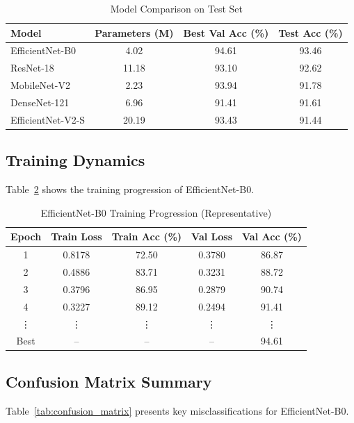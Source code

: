 \documentclass[conference]{IEEEtran}
\begin{document}
\begin{table}[h]
\centering
\caption{Model Comparison on Test Set}
\label{tab:model_comparison}
\begin{tabular}{lccc}
\toprule
\textbf{Model} & \textbf{Parameters (M)} & \textbf{Best Val Acc (\%)} & \textbf{Test Acc (\%)} \\
\midrule
EfficientNet-B0 & 4.02  & 94.61 & 93.46 \\
ResNet-18       & 11.18 & 93.10 & 92.62 \\
MobileNet-V2    & 2.23  & 93.94 & 91.78 \\
DenseNet-121    & 6.96  & 91.41 & 91.61 \\
EfficientNet-V2-S & 20.19 & 93.43 & 91.44 \\
\bottomrule
\end{tabular}
\end{table}



\subsection{Training Dynamics}
Table~\ref{tab:training_dynamics} shows the training progression of EfficientNet-B0.

\begin{table}[htbp]
\caption{EfficientNet-B0 Training Progression (Representative)}
\begin{center}
\begin{tabular}{|c|c|c|c|c|}
\hline
\textbf{Epoch} & \textbf{Train Loss} & \textbf{Train Acc (\%)} & \textbf{Val Loss} & \textbf{Val Acc (\%)} \\
\hline
1 & 0.8178 & 72.50 & 0.3780 & 86.87 \\
2 & 0.4886 & 83.71 & 0.3231 & 88.72 \\
3 & 0.3796 & 86.95 & 0.2879 & 90.74 \\
4 & 0.3227 & 89.12 & 0.2494 & 91.41 \\
\vdots & \vdots & \vdots & \vdots & \vdots \\
Best & -- & -- & -- & 94.61 \\
\hline
\end{tabular}
\label{tab:training_dynamics}
\end{center}
\end{table}



\subsection{Confusion Matrix Summary}
Table~\ref{tab:confusion_matrix} presents key misclassifications for EfficientNet-B0.
\end{document}
